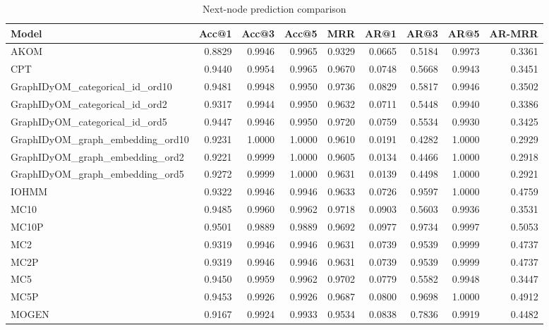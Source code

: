 \begin{table}
\caption{Next-node prediction comparison}
\label{tab:comparison}
\begin{tabular}{lrrrrrrrr}
\toprule
Model & Acc@1 & Acc@3 & Acc@5 & MRR & AR@1 & AR@3 & AR@5 & AR-MRR \\
\midrule
AKOM & 0.8829 & 0.9946 & 0.9965 & 0.9329 & 0.0665 & 0.5184 & 0.9973 & 0.3361 \\
CPT & 0.9440 & 0.9954 & 0.9965 & 0.9670 & 0.0748 & 0.5668 & 0.9943 & 0.3451 \\
GraphIDyOM_categorical_id_ord10 & 0.9481 & 0.9948 & 0.9950 & 0.9736 & 0.0829 & 0.5817 & 0.9946 & 0.3502 \\
GraphIDyOM_categorical_id_ord2 & 0.9317 & 0.9944 & 0.9950 & 0.9632 & 0.0711 & 0.5448 & 0.9940 & 0.3386 \\
GraphIDyOM_categorical_id_ord5 & 0.9447 & 0.9946 & 0.9950 & 0.9720 & 0.0759 & 0.5534 & 0.9930 & 0.3425 \\
GraphIDyOM_graph_embedding_ord10 & 0.9231 & 1.0000 & 1.0000 & 0.9610 & 0.0191 & 0.4282 & 1.0000 & 0.2929 \\
GraphIDyOM_graph_embedding_ord2 & 0.9221 & 0.9999 & 1.0000 & 0.9605 & 0.0134 & 0.4466 & 1.0000 & 0.2918 \\
GraphIDyOM_graph_embedding_ord5 & 0.9272 & 0.9999 & 1.0000 & 0.9631 & 0.0139 & 0.4498 & 1.0000 & 0.2921 \\
IOHMM & 0.9322 & 0.9946 & 0.9946 & 0.9633 & 0.0726 & 0.9597 & 1.0000 & 0.4759 \\
MC10 & 0.9485 & 0.9960 & 0.9962 & 0.9718 & 0.0903 & 0.5603 & 0.9936 & 0.3531 \\
MC10P & 0.9501 & 0.9889 & 0.9889 & 0.9692 & 0.0977 & 0.9734 & 0.9997 & 0.5053 \\
MC2 & 0.9319 & 0.9946 & 0.9946 & 0.9631 & 0.0739 & 0.9539 & 0.9999 & 0.4737 \\
MC2P & 0.9319 & 0.9946 & 0.9946 & 0.9631 & 0.0739 & 0.9539 & 0.9999 & 0.4737 \\
MC5 & 0.9450 & 0.9959 & 0.9962 & 0.9702 & 0.0779 & 0.5582 & 0.9948 & 0.3447 \\
MC5P & 0.9453 & 0.9926 & 0.9926 & 0.9687 & 0.0800 & 0.9698 & 1.0000 & 0.4912 \\
MOGEN & 0.9167 & 0.9924 & 0.9933 & 0.9534 & 0.0838 & 0.7836 & 0.9919 & 0.4482 \\
\bottomrule
\end{tabular}
\end{table}
